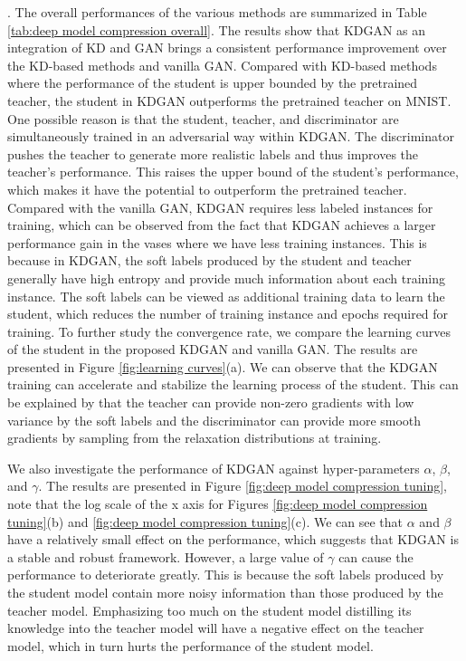 \documentclass{article}
\begin{document}
.
The overall performances of the various methods are summarized in Table \ref{tab:deep model compression overall}.
The results show that KDGAN as an integration of KD and GAN brings a consistent performance improvement over the KD-based methods and vanilla GAN.
Compared with KD-based methods where the performance of the student is upper bounded by the pretrained teacher, the student in KDGAN outperforms the pretrained teacher on MNIST.
One possible reason is that the student, teacher, and discriminator are simultaneously trained in an adversarial way within KDGAN.
The discriminator pushes the teacher to generate more realistic labels and thus improves the teacher's performance.
This raises the upper bound of the student's performance, which makes it have the potential to outperform the pretrained teacher.
Compared with the vanilla GAN, KDGAN requires less labeled instances for training, which can be observed from the fact that KDGAN achieves a larger performance gain in the vases where we have less training instances.
This is because in KDGAN, the soft labels produced by the student and teacher generally have high entropy and provide much information about each training instance.
The soft labels can be viewed as additional training data to learn the student, which reduces the number of training instance and epochs required for training.
To further study the convergence rate, we compare the learning curves of the student in the proposed KDGAN and vanilla GAN.
The results are presented in Figure \ref{fig:learning curves}(a).
We can observe that the KDGAN training can accelerate and stabilize the learning process of the student.
This can be explained by that the teacher can provide non-zero gradients with low variance by the soft labels and the discriminator can provide more smooth gradients by sampling from the relaxation distributions at training.

We also investigate the performance of KDGAN against hyper-parameters $\alpha$, $\beta$, and $\gamma$.
The results are presented in Figure \ref{fig:deep model compression tuning}, note that the log scale of the x axis for Figures \ref{fig:deep model compression tuning}(b) and \ref{fig:deep model compression tuning}(c).
We can see that $\alpha$ and $\beta$ have a relatively small effect on the performance, which suggests that KDGAN is a stable and robust framework.
However, a large value of $\gamma$ can cause the performance to deteriorate greatly.
This is because the soft labels produced by the student model contain more noisy information than those produced by the teacher model.
Emphasizing too much on the student model distilling its knowledge into the teacher model will have a negative effect on the teacher model, which in turn hurts the performance of the student model.
\end{document}
